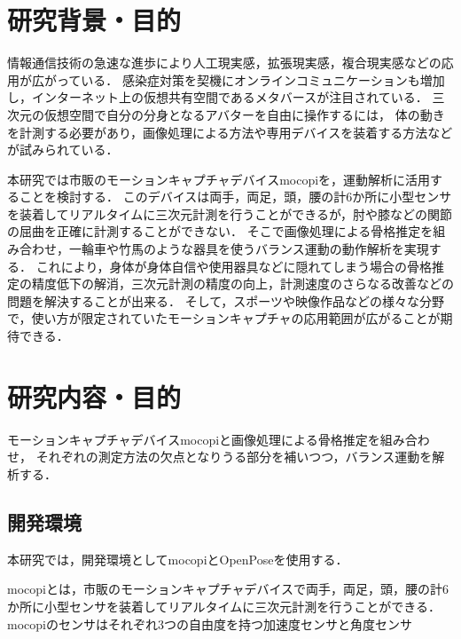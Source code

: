 \documentclass[titlepage]{jarticle}
\begin{document}
\maketitle

%
%
\section{研究背景・目的}
%
情報通信技術の急速な進歩により人工現実感，拡張現実感，複合現実感などの応用が広がっている．
感染症対策を契機にオンラインコミュニケーションも増加し，インターネット上の仮想共有空間であるメタバースが注目されている．
三次元の仮想空間で自分の分身となるアバターを自由に操作するには，
体の動きを計測する必要があり，画像処理による方法や専用デバイスを装着する方法などが試みられている．

本研究では市販のモーションキャプチャデバイスmocopiを，運動解析に活用することを検討する．
このデバイスは両手，両足，頭，腰の計6か所に小型センサを装着してリアルタイムに三次元計測を行うことができるが，肘や膝などの関節の屈曲を正確に計測することができない．
そこで画像処理による骨格推定を組み合わせ，一輪車や竹馬のような器具を使うバランス運動の動作解析を実現する．
これにより，身体が身体自信や使用器具などに隠れてしまう場合の骨格推定の精度低下の解消，三次元計測の精度の向上，計測速度のさらなる改善などの問題を解決することが出来る．
そして，スポーツや映像作品などの様々な分野で，使い方が限定されていたモーションキャプチャの応用範囲が広がることが期待できる．
%
%
\section{研究内容・目的}
%
モーションキャプチャデバイスmocopiと画像処理による骨格推定を組み合わせ，
それぞれの測定方法の欠点となりうる部分を補いつつ，バランス運動を解析する．
%
%
\subsection{開発環境}
%
本研究では，開発環境としてmocopiとOpenPoseを使用する．

mocopi\cite{mocopi}とは，市販のモーションキャプチャデバイスで両手，両足，頭，腰の計6か所に小型センサを装着してリアルタイムに三次元計測を行うことができる．
mocopiのセンサはそれぞれ3つの自由度を持つ加速度センサと角度センサ
\end{document}
